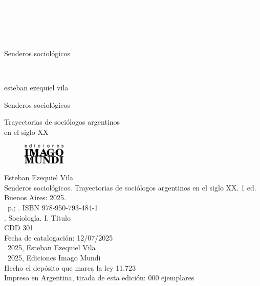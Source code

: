 \newpage
\thispagestyle{empty}
{\textcolor{white}{.}}

\newpage
\thispagestyle{empty}
{\textcolor{white}{.}}

\newpage
\thispagestyle{empty}
{\textcolor{white}{.}}

\vspace{30mm}

\begin{center}
	\LARGE{Senderos sociológicos}
\end{center}

\newpage
\thispagestyle{empty}
{\textcolor{white}{.}}

\newpage
\thispagestyle{empty}
\begin{center}%
{\sc\large{esteban ezequiel vila}}\\ %
\end{center}

\vspace{30mm}

\begin{center}
\LARGE{Senderos sociológicos}\\\vspace{10mm}

\Large{Trayectorias de sociólogos argentinos\\ en el siglo XX}
\end{center}

\vfill

\begin{figure}[b]
\centering
\includegraphics[width=20mm]{./media/logo-imago-ByW.png}
\end{figure}

\newpage
\thispagestyle{empty}

\noindent Esteban Ezequiel Vila \\
\noindent Senderos sociológicos. Trayectorias de sociólogos argentinos en el siglo XX. 1 ed. Buenos Aires: 2025.\\
\noindent \ztotpages\ p.; \valorEspecifico. ISBN 978-950-793-484-1 \\
. Sociología. I. Título \\
\noindent CDD 301\\
\noindent Fecha de catalogación: 12/07/2025 \\
\noindent \textcopyright~2025, Esteban Ezequiel Vila \\
\noindent \textcopyright~2025, Ediciones Imago Mundi\\
\noindent Hecho el depósito que marca la ley 11.723\\
\noindent Impreso en Argentina, tirada de esta edición: 000 ejemplares\\

